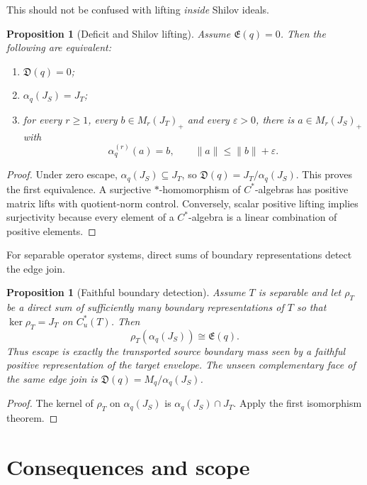 \documentclass[11pt,a4paper]{amsart}
\theoremstyle{plain}
\newtheorem{proposition}[theorem]{Proposition}
\theoremstyle{definition}
\newcommand{\Cu}{C_u^*}
\newcommand{\Esc}{\mathfrak E}
\newcommand{\Def}{\mathfrak D}
\begin{document}
This should not be confused with lifting \emph{inside} Shilov ideals.

\begin{proposition}[Deficit and Shilov lifting]\label{prop:shilovlift}
Assume $\Esc(q)=0$.  Then the following are equivalent:
\begin{enumerate}[label=\textup{(\roman*)}]
\item $\Def(q)=0$;
\item $\alpha_q(J_S)=J_T$;
\item for every $r\geq1$, every $b\in M_r(J_T)_+$ and every $\varepsilon>0$, there is
      $a\in M_r(J_S)_+$ with
      \[
      \alpha_q^{(r)}(a)=b,\qquad \|a\|\leq\|b\|+\varepsilon.
      \]
\end{enumerate}
\end{proposition}

\begin{proof}
Under zero escape, $\alpha_q(J_S)\subseteq J_T$, so
\(\Def(q)=J_T/\alpha_q(J_S)\).  This proves the first equivalence.  A surjective
$*$-homomorphism of $C^*$-algebras has positive matrix lifts with quotient-norm control.
Conversely, scalar positive lifting implies surjectivity because every element of a $C^*$-algebra
is a linear combination of positive elements.
\end{proof}

For separable operator systems, direct sums of boundary representations detect the edge join.

\begin{proposition}[Faithful boundary detection]\label{prop:detection}
Assume $T$ is separable and let $\rho_T$ be a direct sum of sufficiently many boundary
representations of $T$ so that
\(\ker\rho_T=J_T\) on $\Cu(T)$.  Then
\[
 \rho_T(\alpha_q(J_S))\cong\Esc(q).
\]
Thus escape is exactly the transported source boundary mass seen by a faithful positive
representation of the target envelope.  The unseen complementary face of the same edge join is
$\Def(q)=M_q/\alpha_q(J_S)$.
\end{proposition}

\begin{proof}
The kernel of $\rho_T$ on $\alpha_q(J_S)$ is
\(\alpha_q(J_S)\cap J_T\).  Apply the first isomorphism theorem.
\end{proof}

\section{Consequences and scope}\label{sec:scope}
\end{document}
